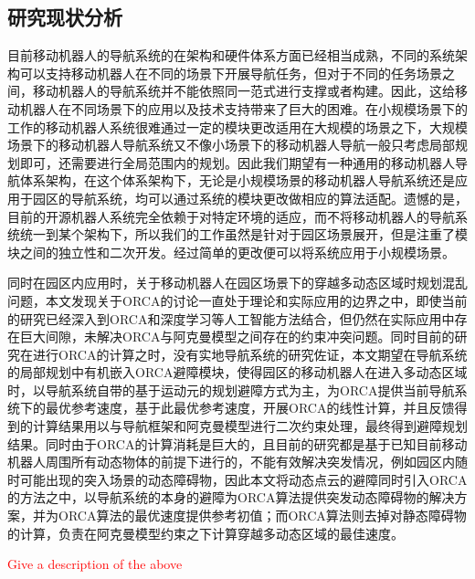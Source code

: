 \subsection{研究现状分析}
目前移动机器人的导航系统的在架构和硬件体系方面已经相当成熟，不同的系统架构可以支持移动机器人在不同的场景下开展导航任务，但对于不同的任务场景之间，移动机器人的导航系统并不能依照同一范式进行支撑或者构建。因此，这给移动机器人在不同场景下的应用以及技术支持带来了巨大的困难。在小规模场景下的工作的移动机器人系统很难通过一定的模块更改适用在大规模的场景之下，大规模场景下的移动机器人导航系统又不像小场景下的移动机器人导航一般只考虑局部规划即可，还需要进行全局范围内的规划。因此我们期望有一种通用的移动机器人导航体系架构，在这个体系架构下，无论是小规模场景的移动机器人导航系统还是应用于园区的导航系统，均可以通过系统的模块更改做相应的算法适配。遗憾的是，目前的开源机器人系统完全依赖于对特定环境的适应，而不将移动机器人的导航系统统一到某个架构下，所以我们的工作虽然是针对于园区场景展开，但是注重了模块之间的独立性和二次开发。经过简单的更改便可以将系统应用于小规模场景。

同时在园区内应用时，关于移动机器人在园区场景下的穿越多动态区域时规划混乱问题，本文发现关于ORCA的讨论一直处于理论和实际应用的边界之中，即使当前的研究已经深入到ORCA和深度学习等人工智能方法结合，但仍然在实际应用中存在巨大间隙，未解决ORCA与阿克曼模型之间存在的约束冲突问题。同时目前的研究在进行ORCA的计算之时，没有实地导航系统的研究佐证，本文期望在导航系统的局部规划中有机嵌入ORCA避障模块，使得园区的移动机器人在进入多动态区域时，以导航系统自带的基于运动元的规划避障方式为主，为ORCA提供当前导航系统下的最优参考速度，基于此最优参考速度，开展ORCA的线性计算，并且反馈得到的计算结果用以与导航框架和阿克曼模型进行二次约束处理，最终得到避障规划结果。同时由于ORCA的计算消耗是巨大的，且目前的研究都是基于已知目前移动机器人周围所有动态物体的前提下进行的，不能有效解决突发情况，例如园区内随时可能出现的突入场景的动态障碍物，因此本文将动态点云的避障同时引入ORCA的方法之中，以导航系统的本身的避障为ORCA算法提供突发动态障碍物的解决方案，并为ORCA算法的最优速度提供参考初值；而ORCA算法则去掉对静态障碍物的计算，负责在阿克曼模型约束之下计算穿越多动态区域的最佳速度。

\textcolor{red}{Give a description of the above}

